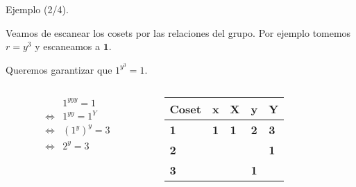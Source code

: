 \documentclass[aspectratio=169, 9pt]{beamer}
\begin{document}
\begin{frame}[fragile]{Ejemplo (2/4).}



Veamos de escanear los cosets por las relaciones del grupo.
Por ejemplo tomemos $r = y^3$ y escaneamos a $\textbf{1}$.


\pause

Queremos garantizar que $1^{y^3} = 1$. 
\pause
\begin{columns}
	\begin{column}{0.6\textwidth}
		\begin{align*}
			&1^{yyy} = 1 \\
			\iff&	1^{yy}	= 1^{Y} \\ 
			\iff&	(1^y)^y = 3 \\ 
			\iff&	2^y = 3 
		\end{align*}
	\end{column}
	\begin{column}{0.4\textwidth}
		\onslide<4->
		\begin{table}[]
			\begin{tabular}{|l|l|l|l|l|}
				\hline
				Coset     & x          & X          & y          & Y          \\ \hline
				\textbf{1} & \textbf{1} & \textbf{1} & \textbf{2} & \textbf{3} \\ \hline
				\textbf{2} &            &            &            &  \textbf{1}          \\ \hline
				\textbf{3} &            &            &     \textbf{1}       &            \\ \hline
			\end{tabular}
		\end{table}
	\end{column}
\end{columns}






%
%
\pause

\end{frame}
\end{document}
